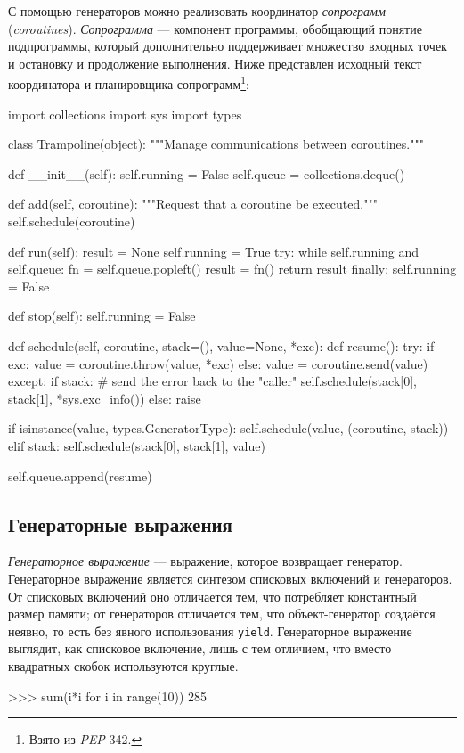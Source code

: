 С помощью генераторов можно реализовать координатор \emph{сопрограмм} (\emph{coroutines}). \emph{Сопрограмма} — компонент программы, обобщающий понятие подпрограммы, который дополнительно поддерживает множество входных точек и остановку и продолжение выполнения. Ниже представлен исходный текст координатора и планировщика сопрограмм\footnote{Взято из \emph{PEP} 342.}:
\begin{pylst}{}{}
import collections
import sys
import types

class Trampoline(object):
    """Manage communications between coroutines."""

    def __init__(self):
        self.running = False
        self.queue = collections.deque()

    def add(self, coroutine):
        """Request that a coroutine be executed."""
        self.schedule(coroutine)

    def run(self):
        result = None
        self.running = True
        try:
            while self.running and self.queue:
                fn = self.queue.popleft()
                result = fn()
            return result
        finally:
            self.running = False

    def stop(self):
        self.running = False

    def schedule(self, coroutine, stack=(), value=None, *exc):
        def resume():
            try:
                if exc:
                    value = coroutine.throw(value, *exc)
                else:
                    value = coroutine.send(value)
            except:
                if stack:
                    # send the error back to the "caller"
                    self.schedule(stack[0], stack[1], *sys.exc_info())
                else:
                    raise

            if isinstance(value, types.GeneratorType):
                self.schedule(value, (coroutine, stack))
            elif stack:
                self.schedule(stack[0], stack[1], value)

        self.queue.append(resume)
\end{pylst}

\subsection{Генераторные выражения}
\emph{Генераторное выражение} — выражение, которое возвращает генератор. Генераторное выражение является синтезом списковых включений и генераторов. От списковых включений оно отличается тем, что потребляет константный размер памяти; от генераторов отличается тем, что объект-генератор создаётся неявно, то есть без явного использования \lstinline{yield}. Генераторное выражение выглядит, как списковое включение, лишь с тем отличием, что вместо квадратных скобок используются круглые.
\begin{pylst}{}{}
>>> sum(i*i for i in range(10))
285
\end{pylst}

